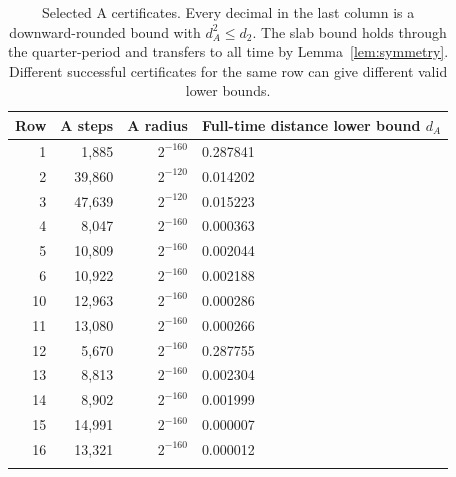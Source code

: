\begin{longtable}{@{}rrrl@{}}
\toprule
Row & A steps & A radius & Full-time distance lower bound $d_A$\\
\midrule
1 & 1,885 & $2^{-160}$ & 0.287841\\
2 & 39,860 & $2^{-120}$ & 0.014202\\
3 & 47,639 & $2^{-120}$ & 0.015223\\
4 & 8,047 & $2^{-160}$ & 0.000363\\
5 & 10,809 & $2^{-160}$ & 0.002044\\
6 & 10,922 & $2^{-160}$ & 0.002188\\
10 & 12,963 & $2^{-160}$ & 0.000286\\
11 & 13,080 & $2^{-160}$ & 0.000266\\
12 & 5,670 & $2^{-160}$ & 0.287755\\
13 & 8,813 & $2^{-160}$ & 0.002304\\
14 & 8,902 & $2^{-160}$ & 0.001999\\
15 & 14,991 & $2^{-160}$ & 0.000007\\
16 & 13,321 & $2^{-160}$ & 0.000012\\
\bottomrule
\caption{Selected A certificates. Every decimal in the last column
is a downward-rounded bound with $d_A^2\le d_2$. The slab bound holds
through the quarter-period and transfers to all time by
Lemma~\ref{lem:symmetry}. Different successful certificates for the
same row can give different valid lower bounds.}
\label{tab:distances}
\end{longtable}

